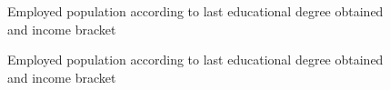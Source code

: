 \documentclass[
  ignorenonframetext,
]{beamer}
\begin{document}
\begin{frame}{}
\label{section-10}
\begin{figure}


\caption{\label{fig-income-education-level-2}Employed population
according to last educational degree obtained and income bracket}

\end{figure}%
\end{frame}

\begin{frame}{}
\label{section-11}
\begin{figure}


\caption{\label{fig-income-education-level-3}Employed population
according to last educational degree obtained and income bracket}

\end{figure}%
\end{frame}
\end{document}
